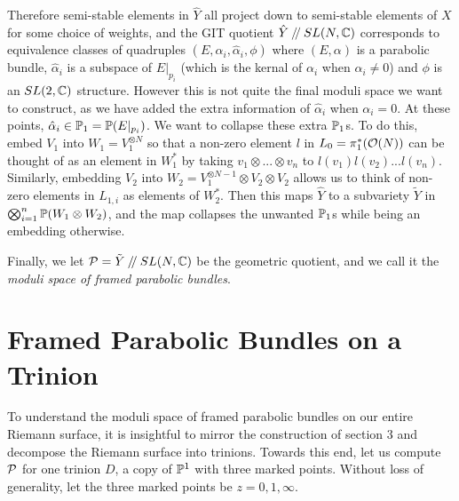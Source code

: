 	Therefore semi-stable elements in $\hat{Y}$ all project down to semi-stable elements of $X$ for some choice of weights, and the GIT quotient $\hat{Y}\mathbin{/\mkern-4mu/} SL(N,\mathbb{C})$ corresponds to equivalence classes of quadruples $(E,\alpha_i, \hat{\alpha}_i, \phi)$ where $(E,\alpha)$ is a parabolic bundle, $\hat{\alpha}_i$ is a subspace of $E|_{p_i}$ (which is the kernal of $\alpha_i$ when $\alpha_i \neq 0$) and $\phi$ is an $SL(2,\mathbb{C})$ structure. However this is not quite the final moduli space we want to construct, as we have added the extra information of $\hat{\alpha}_i$ when $\alpha_i = 0$. At these points, $\hat{\alpha}_i \in \mathbb{P}_1=\mathbb{P}(E|_{p_i})$. We want to collapse these extra $\mathbb{P}_1$s. To do this, embed $V_1$ into $W_1 = V_1^{\otimes N}$ so that a non-zero element $l$ in $L_{0} = \pi_1^\ast(\mathcal{O}(N))$ can be thought of as an element in $W_1^\ast$ by taking $v_1\otimes...\otimes v_n$ to $l(v_1)l(v_2)...l(v_n)$. Similarly, embedding $V_2$ into $W_2 = V_1^{\otimes N-1}\otimes V_2\otimes V_2$ allows us to think of non-zero elements in $L_{1,i}$ as elements of $W_2^\ast$. Then this maps $\hat{Y}$ to a subvariety $\tilde{Y}$ in $\bigotimes_{i=1}^n \mathbb{P}(W_1\otimes W_2)$, and the map collapses the unwanted $\mathbb{P}_1$s while being an embedding otherwise. 
	
	Finally, we let $\mathcal{P} = \tilde{Y}\mathbin{/\mkern-4mu/} SL(N,\mathbb{C})$ be the geometric quotient, and we call it the \emph{moduli space of framed parabolic bundles}.
	
	\section{Framed Parabolic Bundles on a Trinion}
	To understand the moduli space of framed parabolic bundles on our entire Riemann surface, it is insightful to mirror the construction of section 3 and decompose the Riemann surface into trinions. Towards this end, let us compute $\mathcal{P}$ for one trinion $D$, a copy of $\mathbb{P}^1$ with three marked points. Without loss of generality, let the three marked points be $z=0,1,\infty$. 
	
